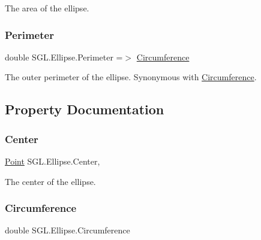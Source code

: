 The area of the ellipse. 

\mbox{\label{class_s_g_l_1_1_ellipse_a3f9ecf8407c0b189ca037c4d51306786}} 
\subsubsection{\texorpdfstring{Perimeter}{Perimeter}}
{\footnotesize\ttfamily double S\+G\+L.\+Ellipse.\+Perimeter =$>$ \mbox{\hyperlink{class_s_g_l_1_1_ellipse_ac8c377f7d5e0efb4ca338e67fede6450}{Circumference}}}



The outer perimeter of the ellipse. Synonymous with \mbox{\hyperlink{class_s_g_l_1_1_ellipse_ac8c377f7d5e0efb4ca338e67fede6450}{Circumference}}. 



\subsection{Property Documentation}
\mbox{\label{class_s_g_l_1_1_ellipse_a0f9ae80639bd70e68bed0513e8fe91bb}} 
\subsubsection{\texorpdfstring{Center}{Center}}
{\footnotesize\ttfamily \mbox{\hyperlink{struct_s_g_l_1_1_point}{Point}} S\+G\+L.\+Ellipse.\+Center\hspace{0.3cm}{\ttfamily [get]}, {\ttfamily [set]}}



The center of the ellipse. 

\mbox{\label{class_s_g_l_1_1_ellipse_ac8c377f7d5e0efb4ca338e67fede6450}} 
\subsubsection{\texorpdfstring{Circumference}{Circumference}}
{\footnotesize\ttfamily double S\+G\+L.\+Ellipse.\+Circumference\hspace{0.3cm}{\ttfamily [get]}}



